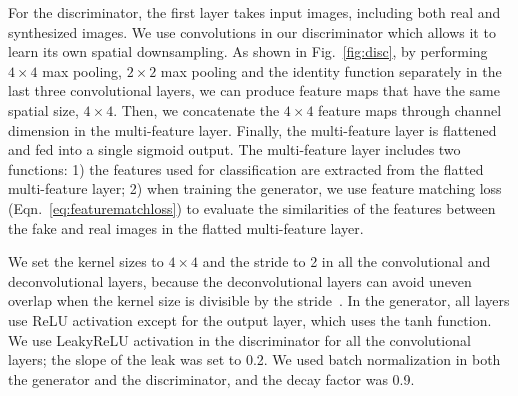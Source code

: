 \documentclass[journal]{IEEEtran}
\begin{document}
For the discriminator, the first layer takes input images, including both real and synthesized images. We use convolutions in our discriminator which allows it to learn its own spatial downsampling. As shown in Fig.~\ref{fig:disc}, by performing $4\times4$ max pooling, $2\times2$ max pooling and the identity function separately in the last three convolutional layers, we can produce feature maps that have the same spatial size, $4\times4$. Then, we concatenate the  $4\times4$ feature maps through channel dimension in the multi-feature layer.
Finally, the  multi-feature layer is flattened and fed into a single sigmoid output.
The multi-feature layer includes two functions: 1) the features used for classification are extracted from the flatted multi-feature layer; 2) when training the generator, we use feature matching loss (Eqn.~\ref{eq:featurematchloss}) to evaluate the similarities of the features between the fake and real images in the flatted multi-feature layer. %

We set the kernel sizes to $4\times4$ and the stride to 2 in all the convolutional and deconvolutional layers, because the deconvolutional layers can avoid uneven overlap when the kernel size is divisible by the stride~\cite{odena2016deconvolution}. In the generator, all layers use ReLU activation except for the output layer, which uses the tanh function. We use LeakyReLU activation in the discriminator for all the convolutional layers; the slope of the leak was set to 0.2.
We used batch normalization in both the generator and the discriminator, and the decay factor was 0.9.


\end{document}

